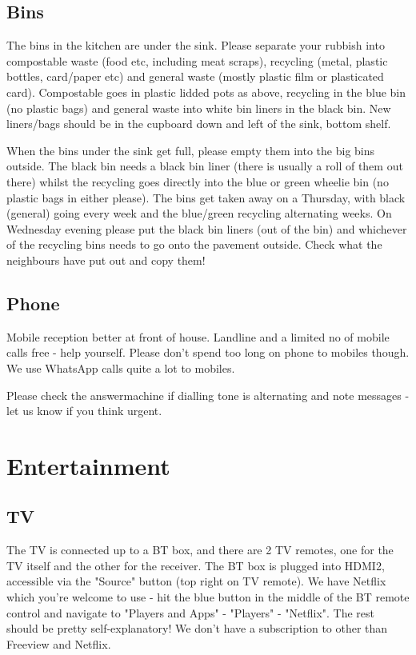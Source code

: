 \documentclass[11pt]{article}
\begin{document}
\subsection*{Bins}
The bins in the kitchen are under the sink. Please separate your rubbish into compostable waste (food etc, including meat scraps), recycling (metal, plastic bottles, card/paper etc) and general waste (mostly plastic film or plasticated card). Compostable goes in plastic lidded pots as above, recycling in the blue bin (no plastic bags) and general waste into white bin liners in the black bin. New liners/bags should be in the cupboard down and left of the sink, bottom shelf. 

When the bins under the sink get full, please empty them into the big bins outside. The black bin needs a black bin liner (there is usually a roll of them out there) whilst the recycling goes directly into the blue or green wheelie bin (no plastic bags in either please). The bins get taken away on a Thursday, with black (general) going every week and the blue/green recycling alternating weeks. On 	{Wednesday evening} please put the black bin liners (out of the bin) and whichever of the recycling bins needs to go onto the pavement outside. Check what the neighbours have put out and copy them!
\subsection*{Phone}
Mobile reception better at front of house.  Landline and a limited no of mobile calls free - help yourself.  Please don't spend too long on phone to mobiles though.  We use WhatsApp calls quite a lot to mobiles. 

Please check the answermachine if dialling tone is alternating and note messages - let us know if you think urgent.  

\section{Entertainment}
\subsection*{TV}
The TV is connected up to a BT box, and there are 2 TV remotes, one for the TV itself and the other for the receiver. The BT box is plugged into HDMI2, accessible via the "Source" button (top right on TV remote). We have Netflix which you're welcome to use - hit the blue button in the middle of the BT remote control and navigate to "Players and Apps" - "Players" - "Netflix". The rest should be pretty self-explanatory!  We don't have a subscription to other than Freeview and Netflix.
\end{document}
